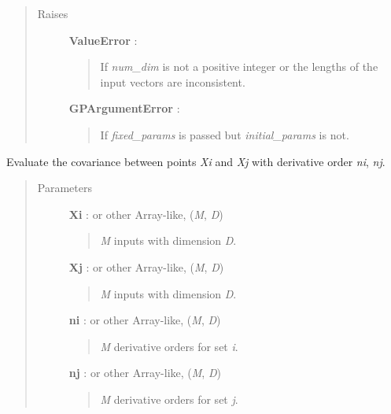 \documentclass[letterpaper,10pt,english]{sphinxmanual}
\begin{document}
\begin{fulllineitems}
\begin{quote}
\begin{description}
\item[{Raises}] \leavevmode
\textbf{ValueError} :
\begin{quote}

If \emph{num\_dim} is not a positive integer or the lengths of the input
vectors are inconsistent.
\end{quote}

\textbf{GPArgumentError} :
\begin{quote}

If \emph{fixed\_params} is passed but \emph{initial\_params} is not.
\end{quote}

\end{description}\end{quote}

\begin{fulllineitems}
\label{gptools.kernel:gptools.kernel.matern.Matern52Kernel.__call__}
Evaluate the covariance between points \emph{Xi} and \emph{Xj} with derivative order \emph{ni}, \emph{nj}.
\begin{quote}\begin{description}
\item[{Parameters}] \leavevmode
\textbf{Xi} :  or other Array-like, (\emph{M}, \emph{D})
\begin{quote}

\emph{M} inputs with dimension \emph{D}.
\end{quote}

\textbf{Xj} :  or other Array-like, (\emph{M}, \emph{D})
\begin{quote}

\emph{M} inputs with dimension \emph{D}.
\end{quote}

\textbf{ni} :  or other Array-like, (\emph{M}, \emph{D})
\begin{quote}

\emph{M} derivative orders for set \emph{i}.
\end{quote}

\textbf{nj} :  or other Array-like, (\emph{M}, \emph{D})
\begin{quote}

\emph{M} derivative orders for set \emph{j}.
\end{quote}


\end{description}
\end{quote}
\end{fulllineitems}
\end{fulllineitems}
\end{document}
